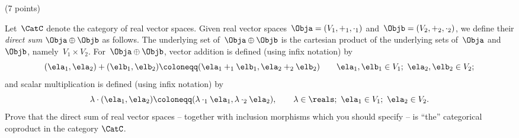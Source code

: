 \documentclass[paper=8.125in:10.250in,pagesize=pdftex,
    headinclude=false,footinclude=false,oneside,egregdoesnotlikesansseriftitles]{kaobook}
\begin{document}
\begin{gradedexercise}\label{ex:DirectSumCopr} (7 points) 


Let~$\CatC$ denote the category of real vector spaces.
Given real vector spaces~$\Obja = (V_1, +_1, \cdot_1)$ and~$\Objb = (V_2, +_2, \cdot_2)$, we define their \emph{direct sum} $\Obja \oplus \Objb$ as follows.
The underlying set of~$\Obja \oplus \Objb$ is the cartesian product of the underlying sets of~$\Obja$ and~$\Objb$, namely~$V_1 \times V_2$.
For~$\Obja \oplus \Objb$, vector addition is defined (using infix notation) by
\begin{equation*}
(\ela_1, \ela_2) + (\elb_1, \elb_2) \coloneqq (\ela_1 +_1 \elb_1, \ela_2 +_2 \elb_2) \quad \quad \ela_1, \elb_1 \in V_1; \ \ela_2, \elb_2 \in V_2;
\end{equation*}
and scalar multiplication is defined (using infix notation) by
\begin{equation*}
\lambda \cdot (\ela_1, \ela_2) \coloneqq (\lambda \cdot_1 \ela_1, \lambda \cdot_2 \ela_2), \quad \quad \lambda \in \reals; \ \ela_1 \in V_1; \ \ela_2 \in V_2.
\end{equation*}
Prove that the direct sum of real vector spaces -- together with inclusion morphisms which you should specify -- is ``the'' categorical coproduct in the category $\CatC$. 
\end{gradedexercise}


\newpage
\end{document}
